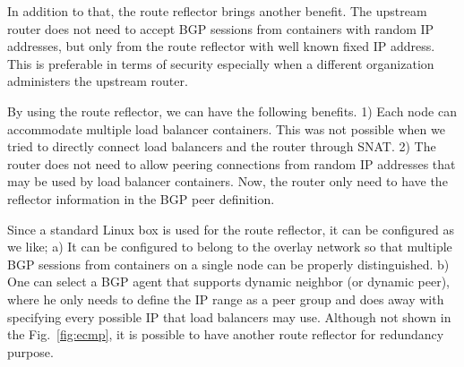 In addition to that, the route reflector brings another benefit.
The upstream router does not need to accept BGP sessions from containers with random IP addresses, but only from the route reflector with well known fixed IP address.
This is preferable in terms of security especially when a different organization administers the upstream router.

By using the route reflector, we can have the following benefits.
1) Each node can accommodate multiple load balancer containers. This was not possible when we tried to directly connect load balancers and the router through SNAT.
2) The router does not need to allow peering connections from random IP addresses that may be used by load balancer containers. Now, the router only need to have the reflector information in the BGP peer definition.

Since a standard Linux box is used for the route reflector, it can be configured as we like;
a) It can be configured to belong to the overlay network so that multiple BGP sessions from containers on a single node can be properly distinguished.
b) One can select a BGP agent that supports dynamic neighbor (or dynamic peer), where he only needs to define the IP range as a peer group and does away with specifying every possible IP that load balancers may use.
Although not shown in the Fig.~\ref{fig:ecmp}, it is possible to have another route reflector for redundancy purpose.

\FloatBarrier


